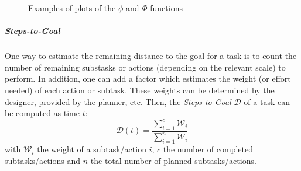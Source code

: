 \documentclass[a4paper,11pt,twoside]{StyleThese}
\begin{document}
\begin{figure}[!htb]
	\centering
	\hfill
	\hfill
	\hfill
	\caption{Examples of plots of the $\phi$ and $\Phi$ functions}
	\label{fig:ote}
\end{figure}

\subparagraph{Steps-to-Goal}
One way to estimate the remaining distance to the goal for a task is to count the number of remaining substasks or actions (depending on the relevant scale) to perform. In addition, one can add a factor which estimates the weight (or effort needed) of each action or subtask. These weights can be determined by the designer, provided by the planner, etc. 
Then, the \textit{Steps-to-Goal} $\mathcal{D}$  of a task can be computed as time $t$:
\begin{equation}\label{eq:edtgs}
\mathcal{D}(t) = \dfrac{\sum\limits_{i=1}^c \mathcal{W}_i}{\sum\limits_{i=1}^n \mathcal{W}_i}
\end{equation}
with $\mathcal{W}_i$ the weight of a subtask/action $i$, $c$ the number of completed subtasks/actions and $n$ the total number of planned subtasks/actions.
\end{document}
